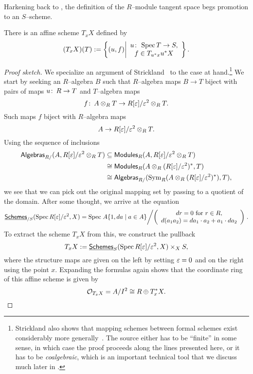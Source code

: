 Harkening back to , the definition of the $R$--module tangent space begs promotion to an $S$--scheme.
\begin{lemma}\label{ConstructionTangentAffineScheme}
There is an affine scheme $T_x X$ defined by \[(T_x X)(T) := \left\{ (u, f) \middle| \begin{array}{c} u\colon\thinspace \operatorname{Spec} T \to S, \\ f \in T_{u^* x} u^* X \end{array} \right\}.\]
\end{lemma}
\begin{proof}[Proof sketch]
We specialize an argument of Strickland~\cite[Proposition 2.94]{StricklandFSFG} to the case at hand.\footnote{Strickland also shows that mapping schemes between formal schemes exist considerably more generally~\cite[Theorem 4.69]{StricklandFSFG}.  The source either has to be ``finite'' in some sense, in which case the proof proceeds along the lines presented here, or it has to be \textit{coalgebraic}, which is an important technical tool that we discuss much later in .}  We start by seeking an $R$--algebra $B$ such that $R$--algebra maps $B \to T$ biject with pairs of maps $u\colon\thinspace R \to T$ and $T$--algebra maps \[f\colon\thinspace A \otimes_R T \to R[\varepsilon] / \varepsilon^2 \otimes_R T.\]  Such maps $f$ biject with $R$--algebra maps \[A \to R[\varepsilon] / \varepsilon^2 \otimes_R T.\]  Using the sequence of inclusions
\begin{align*}
\mathsf{Algebras}_{R/}(A, R[\varepsilon] / \varepsilon^2 \otimes_R T) & \subseteq \mathsf{Modules}_R(A, R[\varepsilon] / \varepsilon^2 \otimes_R T) \\
& \cong \mathsf{Modules}_R(A \otimes_R (R[\varepsilon] / \varepsilon^2)^*, T) \\
& \cong \mathsf{Algebras}_{R/}(\operatorname{Sym}_R(A \otimes_R (R[\varepsilon] / \varepsilon^2)^*), T),
\end{align*}
we see that we can pick out the original mapping set by passing to a quotient of the domain.  After some thought, we arrive at the equation \[\operatorname{\underline{\smash{\mathsf{Schemes}}}}_{/S}(\operatorname{Spec} R[\varepsilon] / \varepsilon^2, X) = \operatorname{Spec} \left. A\{1, da \mid a \in A\} \middle/ \left( \begin{array}{c} \text{$dr = 0$ for $r \in R$}, \\ d(a_1 a_2) = da_1 \cdot a_2 + a_1 \cdot da_2 \end{array} \right) \right. .\]  To extract the scheme $T_x X$ from this, we construct the pullback \[T_x X := \operatorname{\underline{\smash{\mathsf{Schemes}}}}_S(\operatorname{Spec} R[\varepsilon] / \varepsilon^2, X) \times_X S,\] where the structure maps are given on the left by setting $\varepsilon = 0$ and on the right using the point $x$.  Expanding the formulas again shows that the coordinate ring of this affine scheme is given by \[\mathcal{O}_{T_x X} = A / I^2 \cong R \oplus T^*_x X. \qedhere\]
\end{proof}

